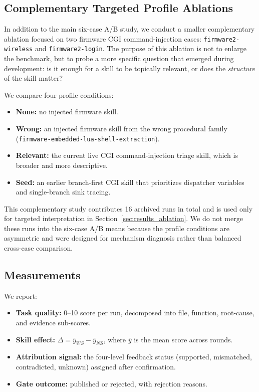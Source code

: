 ﻿\documentclass[preprint,12pt]{elsarticle}
\begin{document}
\subsection{Complementary Targeted Profile Ablations}

In addition to the main six-case A/B study, we conduct a smaller
complementary ablation focused on two firmware CGI command-injection cases:
\texttt{firmware2-wireless} and \texttt{firmware2-login}.  The purpose of
this ablation is not to enlarge the benchmark, but to probe a more specific
question that emerged during development: is it enough for a skill to be
topically relevant, or does the \emph{structure} of the skill matter?

We compare four profile conditions:
\begin{itemize}[leftmargin=*]
    \item \textbf{None:} no injected firmware skill.
    \item \textbf{Wrong:} an injected firmware skill from the wrong
    procedural family (\texttt{firmware-embedded-lua-shell-extraction}).
    \item \textbf{Relevant:} the current live CGI command-injection triage
    skill, which is broader and more descriptive.
    \item \textbf{Seed:} an earlier branch-first CGI skill that prioritizes
    dispatcher variables and single-branch sink tracing.
\end{itemize}

This complementary study contributes 16 archived runs in total and is used
only for targeted interpretation in Section~\ref{sec:results_ablation}.  We
do not merge these runs into the six-case A/B means because the profile
conditions are asymmetric and were designed for mechanism diagnosis rather
than balanced cross-case comparison.

\subsection{Measurements}

We report:
\begin{itemize}[leftmargin=*]
    \item \textbf{Task quality:} 0--10 score per run, decomposed into file,
    function, root-cause, and evidence sub-scores.
    \item \textbf{Skill effect:} $\Delta = \bar{y}_{WS} - \bar{y}_{NS}$,
    where $\bar{y}$ is the mean score across rounds.
    \item \textbf{Attribution signal:} the four-level feedback status
    (supported, mismatched, contradicted, unknown) assigned after
    confirmation.
    \item \textbf{Gate outcome:} published or rejected, with rejection
    reasons.
\end{itemize}
\end{document}
